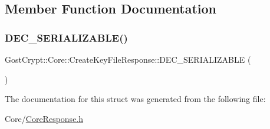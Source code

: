 \subsection{Member Function Documentation}
\mbox{\label{struct_gost_crypt_1_1_core_1_1_create_key_file_response_ab0049940702adffe43c8a63be9622da6}} 
\subsubsection{\texorpdfstring{D\+E\+C\+\_\+\+S\+E\+R\+I\+A\+L\+I\+Z\+A\+B\+L\+E()}{DEC\_SERIALIZABLE()}}
{\footnotesize\ttfamily Gost\+Crypt\+::\+Core\+::\+Create\+Key\+File\+Response\+::\+D\+E\+C\+\_\+\+S\+E\+R\+I\+A\+L\+I\+Z\+A\+B\+LE (\begin{DoxyParamCaption}\item[{\hyperlink{struct_gost_crypt_1_1_core_1_1_create_key_file_response}{Create\+Key\+File\+Response}}]{ }\end{DoxyParamCaption})}



The documentation for this struct was generated from the following file\+:\begin{DoxyCompactItemize}
\item 
Core/\hyperlink{_core_response_8h}{Core\+Response.\+h}\end{DoxyCompactItemize}
